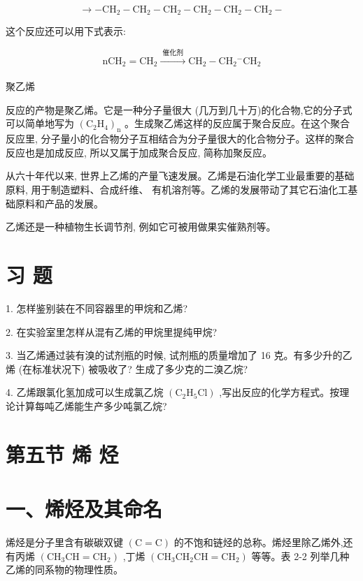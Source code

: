 \documentclass[10pt]{article}
\begin{document}
\[
\rightarrow - {\mathrm{{CH}}}_{2} - {\mathrm{{CH}}}_{2} - {\mathrm{{CH}}}_{2} - {\mathrm{{CH}}}_{2} - {\mathrm{{CH}}}_{2} - {\mathrm{{CH}}}_{2} -
\]

这个反应还可以用下式表示:

\[
\mathrm{n}{\mathrm{{CH}}}_{2} = {\mathrm{{CH}}}_{2}\xrightarrow[]{\text{ 催化剂 }}{\mathrm{{CH}}}_{2} - {\mathrm{{CH}}}_{2}{}^{ - }{\mathrm{{CH}}}_{2}
\]

聚乙烯

反应的产物是聚乙烯。它是一种分子量很大 (几万到几十万)的化合物,它的分子式可以简单地写为 \({\left( {\mathrm{C}}_{2}{\mathrm{H}}_{4}\right) }_{\mathrm{n}}\) 。生成聚乙烯这样的反应属于聚合反应。在这个聚合反应里, 分子量小的化合物分子互相结合为分子量很大的化合物分子。这样的聚合反应也是加成反应, 所以又属于加成聚合反应, 简称加聚反应。

从六十年代以来, 世界上乙烯的产量飞速发展。乙烯是石油化学工业最重要的基础原料, 用于制造塑料、合成纤维、 有机溶剂等。乙烯的发展带动了其它石油化工基础原料和产品的发展。

乙烯还是一种植物生长调节剂, 例如它可被用做果实催熟剂等。

\section*{习 题}

1. 怎样鉴别装在不同容器里的甲烷和乙烯?

2. 在实验室里怎样从混有乙烯的甲烷里提纯甲烷?

3. 当乙烯通过装有溴的试剂瓶的时候, 试剂瓶的质量增加了 16 克。有多少升的乙烯 (在标准状况下) 被吸收了? 生成了多少克的二溴乙烷?

4. 乙烯跟氯化氢加成可以生成氯乙烷 \(\left( {{\mathrm{C}}_{2}{\mathrm{H}}_{5}\mathrm{{Cl}}}\right)\) ,写出反应的化学方程式。按理论计算每吨乙烯能生产多少吨氯乙烷?

\section*{第五节 烯 烃}

\section*{一、烯烃及其命名}

烯烃是分子里含有碳碳双键 \(\left( {\mathrm{C} = \mathrm{C}}\right)\) 的不饱和链烃的总称。烯烃里除乙烯外,还有丙烯 \(\left( {{\mathrm{{CH}}}_{3}\mathrm{{CH}} = {\mathrm{{CH}}}_{2}}\right)\) ,丁烯 \(\left( {{\mathrm{{CH}}}_{3}{\mathrm{{CH}}}_{2}\mathrm{{CH}} = {\mathrm{{CH}}}_{2}}\right)\) 等等。表 2-2 列举几种乙烯的同系物的物理性质。
\end{document}
